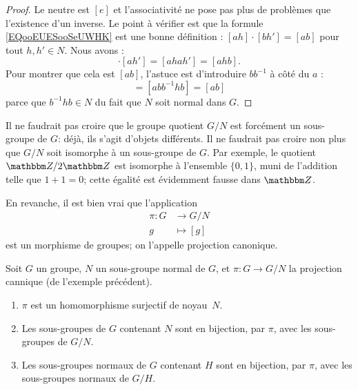 \begin{proof}
    Le neutre est \( [e]\) et l'associativité ne pose pas plus de problèmes que l'existence d'un inverse. Le point à vérifier est que la formule \eqref{EQooEUESooSeUWHK} est une bonne définition : \( [ah]\cdot [bh']=[ab]\) pour tout \( h,h'\in N\). Nous avons :
    \begin{equation}
        [ah]\cdot [ah']=[ahah']=[ahb].
    \end{equation}
    Pour montrer que cela est \( [ab]\), l'astuce est d'introduire \( bb^{-1}\) à côté du \( a\) :
    \begin{equation}
        [ahb]=[abb^{-1}hb]=[ab]
    \end{equation}
    parce que \( b^{-1} hb\in N\) du fait que \( N\) soit normal dans \( G\).
\end{proof}

\begin{example}      \label{EXooFNIKooHxePSs}
    Il ne faudrait pas croire que le groupe quotient \( G/N\) est forcément un sous-groupe de \( G\): déjà, ils s'agit d'objets différents. Il ne faudrait pas croire non plus que \( G/N\) soit isomorphe à un sous-groupe de \( G \). Par exemple, le quotient \( \eZ/2\eZ\) est isomorphe à l'ensemble \( \{ 0,1 \}\), muni de l'addition telle que \( 1+1=0\); cette égalité est évidemment fausse dans \( \eZ\).

    En revanche, il est bien vrai que l'application
    \begin{equation}
        \begin{aligned}
            \pi \colon G&\to G/N \\
            g&\mapsto [g]
        \end{aligned}
    \end{equation}
    est un morphisme de groupes; on l'appelle projection canonique.
\end{example}

\begin{proposition}
Soit \( G \) un groupe, \( N \) un sous-groupe normal de \( G \), et  \( \pi\colon G\to G/N\) la projection cannique (de l'exemple précédent).
  \begin{enumerate}
  \item
    \( \pi \)  est un homomorphisme surjectif de noyau~\( N\).
  \item
      Les sous-groupes de \( G \) contenant \( N \) sont en bijection, par  \( \pi \), avec les sous-groupes de \( G/N \).
  \item
      Les sous-groupes normaux de \( G \) contenant \( H \) sont en bijection, par  \( \pi \), avec les sous-groupes normaux de \( G/H \).
  \end{enumerate}
\end{proposition}


